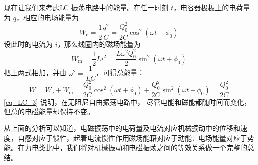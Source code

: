 现在让我们来考虑LC 振荡电路中的能量。在任一时刻 $t$，电容器极板上的电荷量为 $q$，相应的电场能量为
\begin{equation}
W_{\mathrm e}=\frac{1}{2} \frac{q^{2}}{C}=\frac{Q_{0}^{2}}{2 C} \cos ^{2}\left(\omega t+\phi_{0}\right)
\end{equation}
设此时的电流为 $i$，那么线圈内的磁场能量为
\begin{equation}
W_{\mathrm{m}}=\frac{1}{2} L i^{2}=\frac{L \omega^{2} Q_{0}^{2}}{2} \sin ^{2}\left(\omega t+\phi_{0}\right)
\end{equation}
把上两式相加，并由 $\omega^{2}=\dfrac{1}{L C}$，可得总能量：
\begin{equation} \label{eq_LC_3}
W=W_{\mathrm{e}}+W_{\mathrm{m}}=\frac{Q_{0}^{2}}{2 C} \cos ^{2}\left(\omega t+\phi_{0}\right)+\frac{Q_{0}^{2}}{2 C} \sin ^{2}\left(\omega t+\phi_{0}\right)=\frac{Q_{0}^{2}}{2 C}
\end{equation}
\autoref{eq_LC_3} 说明，在无阻尼自由振荡电路中， 尽管电能和磁能都随时间而变化，但总的电磁能量却保持不变。

从上面的分析可以知道，电磁振荡中的电荷量及电流对应机械振动中的位移和速度，自感对应于惯性，起着电流惯性作用磁场能藉对应于动能，电场能量对应于势能。在力电类比中，我们将对机械振动和电磁振荡之间的等效关系做一个完整的总结。
